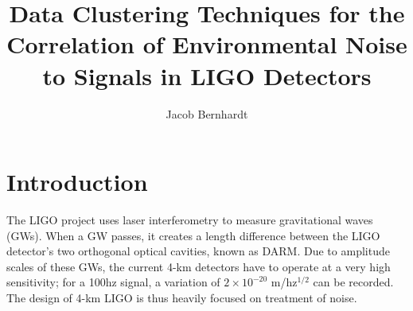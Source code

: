 \documentclass[colorlinks=true,pdfstartview=FitV,linkcolor=blue,
            citecolor=red,urlcolor=magenta]{ligodoc}
\title{Data Clustering Techniques for the Correlation of Environmental Noise to Signals in LIGO Detectors}
\author{Jacob Bernhardt}
\begin{document}

\section{Introduction}
The LIGO project uses laser interferometry to measure gravitational waves (GWs).
When a GW passes, it creates a length difference between the LIGO detector's two orthogonal optical cavities, known as DARM.
Due to amplitude scales of these GWs, the current 4-km detectors have to operate at a very high sensitivity; for a 100hz signal, a variation of $2\times 10^{-20}$ m/hz$^{1/2}$ can be recorded.
The design of 4-km LIGO is thus heavily focused on treatment of noise.
\end{document}
